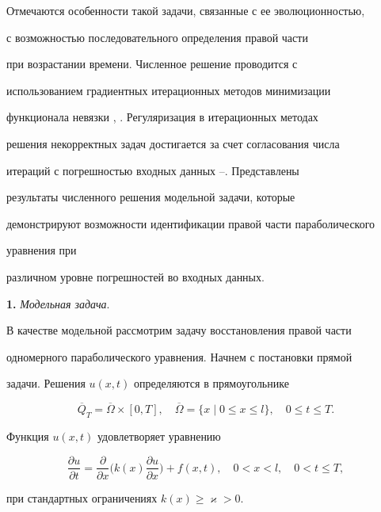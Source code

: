 Отмечаются особенности такой задачи, связанные с ее эволюционностью,


с возможностью последовательного определения правой части


при возрастании времени. Численное решение проводится с


использованием градиентных итерационных методов минимизации


функционала невязки \cite{d4}, \cite{d5}. Регуляризация в итерационных методах


решения некорректных задач достигается за счет согласования числа


итераций с погрешностью входных данных \cite{d5}--\cite{d7}. Представлены


результаты численного решения модельной задачи, которые


демонстрируют возможности идентификации правой части параболического


уравнения при


различном уровне погрешностей во входных данных. 


\medskip





{\bf 1.} {\it Модельная задача}.


В качестве модельной рассмотрим задачу восстановления правой части


одномерного параболического уравнения. Начнем с постановки прямой


задачи. Решения $u(x,t)$ определяются в прямоугольнике


$$


\overline{Q}_T=\overline{\Omega}\times[0,T],


\quad \overline{\Omega}=\{x \mid 0\le x\le l\},


\quad 0\le t\le T.


$$


Функция $u(x,t)$ удовлетворяет уравнению


\begin{equation}\label{6.45}


\frac{\partial u}{\partial t}=


\frac\partial{\partial x}\bigg(k(x)\frac{\partial u}{\partial


x}\bigg) + f(x,t) , \quad 0 < x < l, \quad 0 < t \le T ,


\end{equation}


при стандартных ограничениях $k(x) \geq \varkappa >0$.


